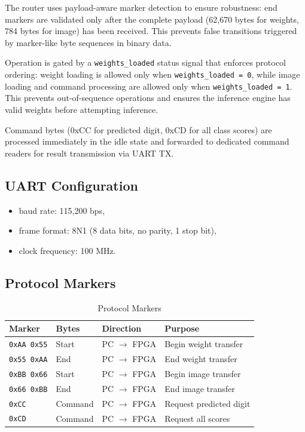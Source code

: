 \documentclass[12pt,a4paper]{report}
\begin{document}
The router uses payload-aware marker detection to ensure robustness: end markers are validated only after the complete payload (62,670 bytes for weights, 784 bytes for image) has been received. This prevents false transitions triggered by marker-like byte sequences in binary data.

\newpage
Operation is gated by a \texttt{weights\_loaded} status signal that enforces protocol ordering: weight loading is allowed only when \texttt{weights\_loaded = 0}, while image loading and command processing are allowed only when \texttt{weights\_loaded = 1}. This prevents out-of-sequence operations and ensures the inference engine has valid weights before attempting inference.

Command bytes (0xCC for predicted digit, 0xCD for all class scores) are processed immediately in the idle state and forwarded to dedicated command readers for result transmission via UART TX.

\subsection{UART Configuration}

\begin{itemize}
    \item baud rate: 115,200 bps,
    \item frame format: 8N1 (8 data bits, no parity, 1 stop bit),
    \item clock frequency: 100 MHz.
\end{itemize}

\subsection{Protocol Markers}

\begin{table}[H]
\centering
\caption{Protocol Markers}
\begin{tabular}{llll}
\toprule
\textbf{Marker} & \textbf{Bytes} & \textbf{Direction} & \textbf{Purpose} \\
\midrule
\texttt{0xAA 0x55} & Start & PC $\rightarrow$ FPGA & Begin weight transfer \\
\texttt{0x55 0xAA} & End & PC $\rightarrow$ FPGA & End weight transfer \\
\texttt{0xBB 0x66} & Start & PC $\rightarrow$ FPGA & Begin image transfer \\
\texttt{0x66 0xBB} & End & PC $\rightarrow$ FPGA & End image transfer \\
\texttt{0xCC} & Command & PC $\rightarrow$ FPGA & Request predicted digit \\
\texttt{0xCD} & Command & PC $\rightarrow$ FPGA & Request all scores \\
\bottomrule
\end{tabular}
\end{table}
\end{document}

